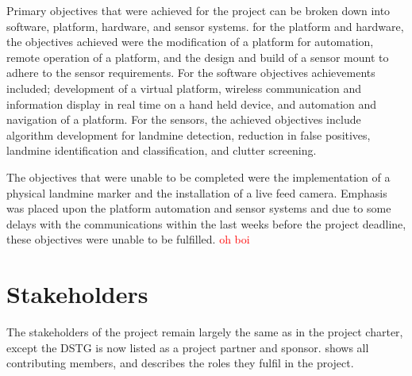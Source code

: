 \documentclass[main.tex]{subfiles}
\begin{document}
Primary objectives that were achieved for the project can be broken down into software, platform, hardware, and sensor systems. for the platform and hardware, the objectives achieved were the modification of a platform for automation, remote operation of a platform, and the design and build of a sensor mount to adhere to the sensor requirements. For the software objectives achievements included; development of a virtual platform, wireless communication and information display in real time on a hand held device, and automation and navigation of a platform. For the sensors, the achieved objectives include algorithm development for landmine detection, reduction in false positives, landmine identification and classification, and clutter screening.

The objectives that were unable to be completed were the implementation of a physical landmine marker and the installation of a live feed camera. Emphasis was placed upon the platform automation and sensor systems and due to some delays with the communications within the last weeks before the project deadline, these objectives were unable to be fulfilled.  \textcolor{red}{oh boi}

\section{Stakeholders}

The stakeholders of the project remain largely the same as in the project charter, except the DSTG is now listed as a project partner and sponsor.  shows all contributing members, and describes the roles they fulfil in the project.  
\end{document}
